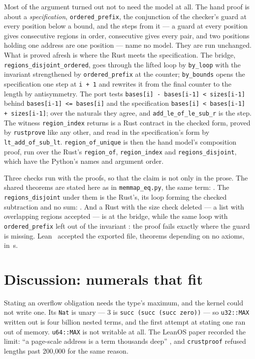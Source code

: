 \documentclass[11pt]{article}
\begin{document}
Most of the argument turned out not to need the model at all.  The hand
proof is about a \emph{specification}, \texttt{ordered\_prefix}, the
conjunction of the checker's guard at every position below a bound, and
the steps from it --- a guard at every position gives consecutive regions
in order, consecutive gives every pair, and two positions holding one
address are one position --- name no model.  They are run unchanged.  What
is proved afresh is where the Rust meets the specification.  The bridge,
\texttt{regions\_disjoint\_ordered}, goes through the lifted loop by
\texttt{by\_loop} with the invariant strengthened by
\texttt{ordered\_prefix} at the counter; \texttt{by\_bounds} opens the
specification one step at \texttt{i + 1} and rewrites it from the final
counter to the length by antisymmetry.  The port tests
\texttt{bases[i] - bases[i-1] < sizes[i-1]} behind
\texttt{bases[i-1] <= bases[i]} and the specification
\texttt{bases[i] < bases[i-1] + sizes[i-1]}; over the naturals they agree,
and \texttt{add\_le\_of\_le\_sub\_r} is the step.  The witness
\texttt{region\_index} returns is a Rust contract in the checked form,
proved by \texttt{rustprove} like any other, and read in the
specification's form by \texttt{lt\_add\_of\_sub\_lt}.
\texttt{region\_of\_unique} is then the hand model's composition proof, run
over the Rust's \texttt{region\_of}, \texttt{region\_index} and
\texttt{regions\_disjoint}, which have the Python's names and argument
order.

Three checks run with the proofs, so that the claim is not only in the
prose.  The shared theorems are stated here as in \texttt{memmap\_eq.py},
the same term: \foundingSame{}.  The \texttt{regions\_disjoint} under them
is the Rust's, its loop forming the checked subtraction and no sum:
\foundingIsRust{}.  And a Rust with the size check deleted --- a list with
overlapping regions accepted --- is \foundingMutant{} at the bridge, while
the same loop with \texttt{ordered\_prefix} left out of the invariant
\foundingMutantWhy{}: the proof fails exactly where the guard is missing.
Lean~\leanVersion{} accepted the exported file, \foundingLean{} theorems
depending on no axioms, in \foundingLeanSeconds{}\,s.

\section{Discussion: numerals that fit}
\label{sec:numerals}

Stating an overflow obligation needs the type's maximum, and the kernel
could not write one.  Its \texttt{Nat} is unary --- $3$ is
\texttt{succ (succ (succ zero))} --- so \texttt{u32::MAX} written out is
four billion nested terms, and the first attempt at stating one ran out of
memory.  \texttt{u64::MAX} is not writable at all.  The LeanOS paper
recorded the limit: ``a page-scale address is a term thousands deep''
\cite{hartshorn2026leanos}, and \texttt{crustproof} refused lengths past
200{,}000 for the same reason.
\end{document}
